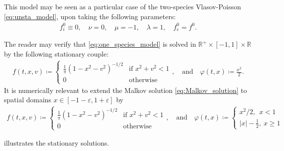 \documentclass{article}
\numberwithin{equation}{section}
\newcommand{\R}{\mathbb{R}}
\begin{document}
This model may be seen as a particular case of the two-species Vlasov-Poisson \cref{eq:unsta_model}, upon taking the following parameters:
\begin{align*}
	f_i^0 \equiv 0, \quad \nu = 0, \quad \mu = -1, \quad \lambda = 1, \quad f_e^0 = f^0.
\end{align*}

The reader may verify that \cref{eq:one_species_model} is solved in $\R^+ \times [-1,1] \times \mathbb{R}$ by the following stationary couple:
\begin{align}\label{eq:Malkov_solution}
	f(t,x,v) \coloneqq 
	\begin{cases}
		\frac{1}{\pi} \left(1 - x^2 - v^2\right)^{-1/2} & \text{if } x^2 + v^2 < 1 \\
		0 & \text{otherwise}
	\end{cases}, \quad \text{and} \quad
	\varphi(t,x) \coloneqq \frac{x^2}{2}.
\end{align}
It is numerically relevant to extend the Malkov solution \cref{eq:Malkov_solution} to spatial domains $x \in [-1-\varepsilon, 1+\varepsilon]$ by 
\begin{align}\label{eq:Malkov_solution_ext}
	f(t,x,v) \coloneqq 
	\begin{cases}
		\frac{1}{\pi} \left(1 - x^2 - v^2\right)^{-1/2} & \text{if } x^2 + v^2 < 1 \\
		0 & \text{otherwise}
	\end{cases}, \quad \text{and} \quad
	\varphi(t,x) \coloneqq \left\{\begin{array}{c}
	x^2/2,\ \ x<1\\
	|x|-\frac{1}{2},\ x\ge 1
	\end{array}\right.%
\end{align}

 illustrates the stationary solutions.
\end{document}
